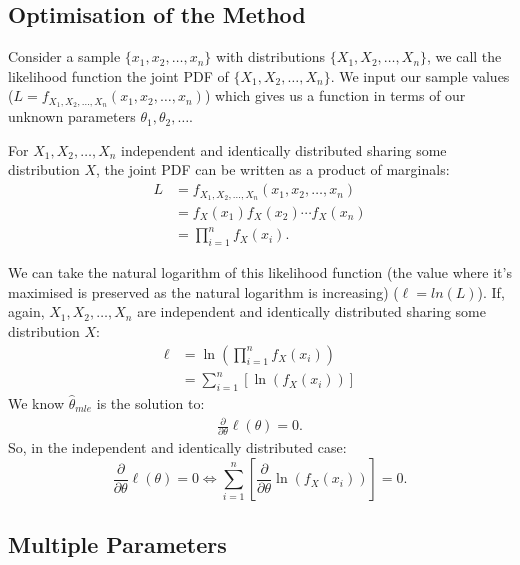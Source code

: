 \documentclass[a4paper, 12pt, twoside]{article}
\begin{document}
\subsection{Optimisation of the Method}

Consider a sample $\{x_1, x_2, \ldots, x_n\}$ with distributions
$\{X_1, X_2, \ldots, X_n\}$, we call the likelihood function the
joint PDF of $\{X_1, X_2, \ldots, X_n\}$. We input our sample values
($L = f_{X_1, X_2, \ldots, X_n}(x_1, x_2, \ldots, x_n)$) which gives us
a function in terms of our unknown parameters $\theta_1, \theta_2, \ldots$.

\vspace{\baselineskip}

For $X_1, X_2, \ldots, X_n$ independent and identically distributed
sharing some distribution $X$, the joint PDF can be written as a
product of marginals:
\begin{align*}
    L & = f_{X_1, X_2, \ldots, X_n}(x_1, x_2, \ldots, x_n) \\
      & = f_X(x_1)f_X(x_2)\cdots f_X(x_n)                  \\
      & = \prod_{i = 1}^n f_X(x_i).
\end{align*}

We can take the natural logarithm of this likelihood function (the value
where it's maximised is preserved as the natural logarithm is increasing)
($\ell = ln(L)$). If, again, $X_1, X_2, \ldots, X_n$ are independent
and identically distributed sharing some distribution $X$:
\begin{align*}
    \ell & = \ln{\left(\prod_{i = 1}^n f_X(x_i)\right)} \\
         & = \sum_{i = 1}^n\left[\ln{(f_X(x_i))}\right]
\end{align*}
We know $\hat\theta_{mle}$ is the solution to:
\begin{align*}
    \frac{\partial}{\partial\theta}\ell(\theta) = 0.
\end{align*}
So, in the independent and identically distributed case:
\begin{equation*}
    \frac{\partial}{\partial\theta}\ell(\theta) = 0
    \Longleftrightarrow
    \sum_{i = 1}^n\left[\frac{\partial}{\partial\theta}\ln{(f_X(x_i))}\right]
    = 0.
\end{equation*}

\subsection{Multiple Parameters}
\end{document}
